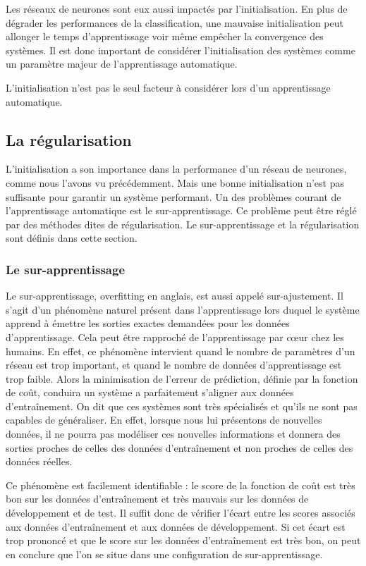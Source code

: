 Les réseaux de neurones sont eux aussi impactés par l'initialisation. En plus de dégrader les performances de la classification, une mauvaise initialisation peut allonger le temps d'apprentissage voir même empêcher la convergence des systèmes. Il est donc important de considérer l’initialisation des systèmes comme un paramètre majeur de l'apprentissage automatique.

L’initialisation n'est pas le seul facteur à considérer lors d'un apprentissage automatique.

\subsection{La régularisation}
L’initialisation a son importance dans la performance d'un réseau de neurones, comme nous l'avons vu précédemment. Mais une bonne initialisation n'est pas suffisante pour garantir un système performant. Un des problèmes courant de l'apprentissage automatique est le sur-apprentissage. Ce problème peut être réglé par des méthodes dites de régularisation. Le sur-apprentissage et la régularisation sont définis dans cette section.

\subsubsection{Le sur-apprentissage}
Le sur-apprentissage, overfitting en anglais, est aussi appelé sur-ajustement. Il s'agit d'un phénomène naturel présent dans l'apprentissage lors duquel le système apprend à émettre les sorties exactes demandées pour les données d'apprentissage. Cela peut être rapproché de l'apprentissage par cœur chez les humains. En effet, ce phénomène intervient quand le nombre de paramètres d'un réseau est trop important, et quand le nombre de données d'apprentissage est trop faible. Alors la minimisation de l'erreur de prédiction, définie par la fonction de coût, conduira un système a parfaitement s'aligner aux données d’entraînement. On dit que ces systèmes sont très spécialisés et qu'ils ne sont pas capables de généraliser. En effet, lorsque nous lui présentons de nouvelles données, il ne pourra pas modéliser ces nouvelles informations et donnera des sorties proches de celles des données d’entraînement et non proches de celles des données réelles.

Ce phénomène est facilement identifiable : le score de la fonction de coût est très bon sur les données d’entraînement et très mauvais sur les données de développement et de test. Il suffit donc de vérifier l'écart entre les scores associés aux données d’entraînement et aux données de développement.  Si cet écart est trop prononcé et que le score sur les données d’entraînement est très bon, on peut en conclure que l'on se situe dans une configuration de sur-apprentissage.


